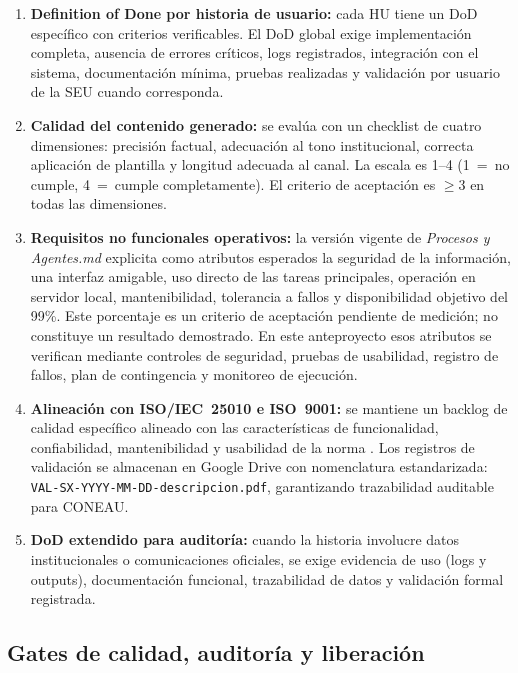 \documentclass[a4paper, 12pt]{article}
\begin{document}
\begin{enumerate}[label=\arabic*.]
  \item \textbf{Definition of Done por historia de usuario:} cada \ac{HU} tiene un \ac{DoD} espec\'ifico con criterios verificables. El \ac{DoD} global exige implementaci\'on completa, ausencia de errores cr\'iticos, logs registrados, integraci\'on con el sistema, documentaci\'on m\'inima, pruebas realizadas y validaci\'on por usuario de la \ac{SEU} cuando corresponda.

  \item \textbf{Calidad del contenido generado:} se eval\'ua con un checklist de cuatro dimensiones: precisi\'on factual, adecuaci\'on al tono institucional, correcta aplicaci\'on de plantilla y longitud adecuada al canal. La escala es 1--4 (1~=~no cumple, 4~=~cumple completamente). El criterio de aceptaci\'on es $\geq 3$ en todas las dimensiones.

  \item \textbf{Requisitos no funcionales operativos:} la versi\'on vigente de \textit{Procesos y Agentes.md} explicita como atributos esperados la seguridad de la informaci\'on, una interfaz amigable, uso directo de las tareas principales, operaci\'on en servidor local, mantenibilidad, tolerancia a fallos y disponibilidad objetivo del 99\%. Este porcentaje es un criterio de aceptaci\'on pendiente de medici\'on; no constituye un resultado demostrado. En este anteproyecto esos atributos se verifican mediante controles de seguridad, pruebas de usabilidad, registro de fallos, plan de contingencia y monitoreo de ejecuci\'on.

  \item \textbf{Alineaci\'on con ISO/IEC~25010 e ISO~9001:} se mantiene un backlog de calidad espec\'ifico alineado con las caracter\'isticas de funcionalidad, confiabilidad, mantenibilidad y usabilidad de la norma \parencite{iso25010, iso9001}. Los registros de validaci\'on se almacenan en Google Drive con nomenclatura estandarizada: \texttt{VAL-SX-YYYY-MM-DD-descripcion.pdf}, garantizando trazabilidad auditable para \ac{CONEAU}.

  \item \textbf{DoD extendido para auditor\'ia:} cuando la historia involucre datos institucionales o comunicaciones oficiales, se exige evidencia de uso (logs y outputs), documentaci\'on funcional, trazabilidad de datos y validaci\'on formal registrada.
\end{enumerate}

\subsection{Gates de calidad, auditor\'ia y liberaci\'on}
\end{document}
